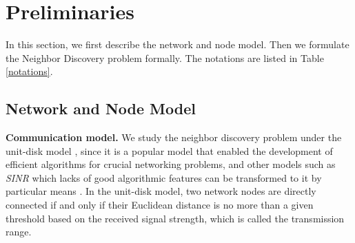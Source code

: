 \section{Preliminaries}
\label{sectionmodel}


In this section, we first describe the network and node model.
Then we formulate the Neighbor Discovery problem formally. 
The notations are listed in Table \ref{notations}.

\begin{table}[!t]
\renewcommand{\arraystretch}{1.3}
\caption{Notations for Neighbor Discovery}
\label{notations}
\centering
{}
\end{table}


\subsection{Network and Node Model}

\textbf{Communication model.} 
We study the neighbor discovery 
problem under the unit-disk model \cite{moscibroda2006complexity, wang2015connectivity}, 
since it is a popular model that enabled the development of efficient algorithms for crucial networking problems, 
and other models such as \emph{SINR} which lacks of good algorithmic features can be transformed to 
it by particular means \cite{lebhar2009unit}.  
In the unit-disk model, two network nodes are directly connected if and only 
if their Euclidean distance is no more than a given threshold based on the received signal strength, 
which is called the transmission range.

